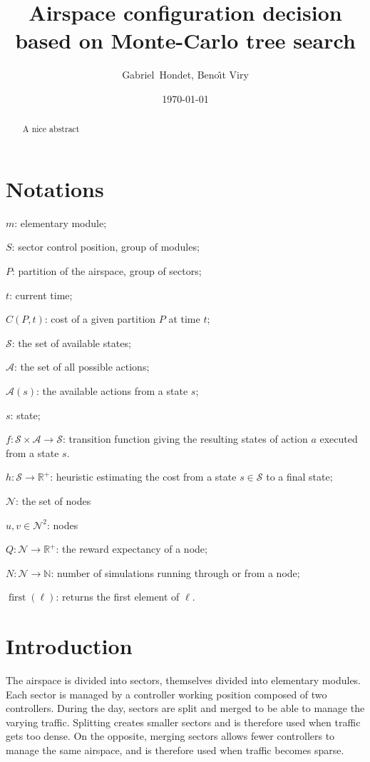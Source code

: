 \documentclass[oneside,twocolumn]{article}
\title{Airspace configuration decision based on Monte-Carlo tree search}
\author{Gabriel~Hondet, Beno\^{\i}t Viry}
\date{\today}
\DeclareMathOperator{\first}{first}
\begin{document}
\maketitle

\begin{abstract}
  A nice abstract
\end{abstract}


\section*{Notations}
\begin{compactitem}
  \item $m$: elementary module;
  \item $S$: sector control position, group of modules;
  \item $P$: partition of the airspace, group of sectors;
  \item $t$: current time;
  \item $C(P, t)$: cost of a given partition $P$ at time $t$;
  \item \(\mathcal{S}\): the set of available states;
  \item \(\mathcal{A}\): the set of all possible actions;
  \item \(\mathcal{A}(s)\): the available actions from a state \(s\);
  \item $s$: state;
  \item \(f \colon \mathcal{S} \times \mathcal{A} \to \mathcal{S}\):
    transition function giving the resulting states of action \(a\) executed
    from a state \(s\).
  \item $h \colon \mathcal{S} \to \mathbb{R}^+$: heuristic estimating the cost
    from a state \(s \in \mathcal{S}\) to a final state;
  \item \(\mathcal{N}\): the set of nodes
  \item \(u, v \in \mathcal{N}^2\): nodes
  \item \(Q \colon \mathcal{N} \to \mathbb{R}^+\): the reward expectancy of a
    node;
  \item \(N \colon \mathcal{N} \to \mathbb{N}\): number of simulations running
    through or from a node;
  \item \(\first(\ell)\): returns the first element of \(\ell\).
\end{compactitem}

\section{Introduction}
The airspace is divided into sectors, themselves divided into elementary
modules. Each sector is managed by a controller working position composed of two
controllers.
During the day, sectors are split and merged to be able to
manage the varying traffic. Splitting creates smaller sectors and is therefore
used when traffic gets too dense. On the opposite, merging sectors allows fewer
controllers to manage the same airspace, and is therefore used when traffic
becomes sparse.
\end{document}
